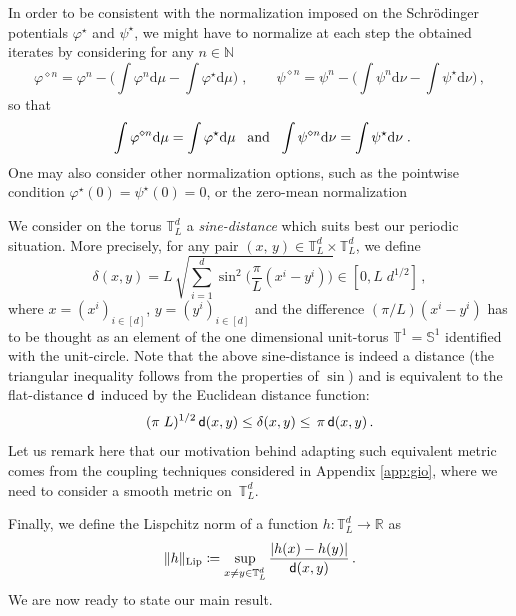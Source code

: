 \documentclass[final,12pt]{colt2023} %
\newcommand{\bes}{\begin{equation}}
\newcommand{\ees}{\end{equation}}
\newcommand{\De}{\mathrm{d}}
\newcommand{\sfd}{{\sf d}}
\def\torus{\tset}
\def\torusL{\torus_L}
\def\tset{\mathbb{T}}
\def\eqsp{\;}
\def\varphistar{\varphi^\star}
\def\psistar{\psi^{\star}}
\begin{document}
In order to be consistent with the normalization imposed on the Schr\"odinger potentials $\varphistar$ and $\psistar$, we might have to normalize at each step the obtained iterates by considering for any $n\in \mathbb{N}$ 
 \bes
 \varphi^{\diamond n}=\varphi^n-\biggl(\int\varphi^n\De\mu-\int\varphistar\De\mu\biggr)\eqsp, \qquad 
 \psi^{\diamond n}=\psi^n-\biggl(\int\psi^n\De\nu-\int\psistar\De\nu\biggr)\,,
 \ees
 so that
 \begin{equation}
   \label{eq:equality_int}
\text{   $\int\varphi^{\diamond n}\De\mu=\int\varphistar\De\mu$ \, and \,  $\int\psi^{\diamond n}\De\nu=\int\psistar\De\nu $} \eqsp.
 \end{equation}
One may also consider other normalization options, such as  the pointwise condition $\varphistar(0)=\psistar(0)=0$, or the zero-mean normalization \citep{marinogerolin2020, carlier2020differential, deligiannidis2021quantitative, Carlier22multisink}
 

We consider on the torus $\mathbb{T}_L^d$ a \emph{sine-distance} which suits best our periodic situation. More precisely, for any pair $(x,\,y)\in\mathbb{T}_L^d\times \mathbb{T}_L^d$, we define 
\begin{equation}\label{def:delta}
\delta(x,y)= L\,\sqrt{\sum_{i=1}^d \sin^2\biggl(\frac{\pi}{L}(x^i-y^i)\biggr)}\in [0,L\eqsp d^{1/2}] \, ,
\end{equation}
where $x=(x^i)_{i\in[d]}$, $y=(y^i)_{i\in[d]}$ and the difference $(\pi/L) (x^i-y^i)$ has to be thought as an element of the one dimensional unit-torus $\mathbb{T}^1=\mathbb{S}^1$ identified with the unit-circle. Note that the above sine-distance is indeed a distance (the triangular inequality follows from the properties of $\sin$) and is equivalent to the flat-distance $\sfd$ induced by the Euclidean distance function:
\[(\pi\eqsp L)^{1/2}\,\sfd(x,y)\leq \delta(x,y)\leq\,\pi\,\sfd(x,y)\,.\] Let us remark here that our motivation behind adapting such equivalent metric comes from the coupling techniques considered in Appendix \ref{app:gio}, where we need to consider a smooth metric on~$\torusL^d$.





Finally, we define the Lispchitz norm of a function $h:\mathbb{T}_L^d \to \mathbb{R}$ as
\bes
\|h\|_{\mathrm{Lip}}\coloneqq \sup_{x\neq y\in\mathbb{T}_L^d}\frac{|h(x)-h(y)|}{\sfd(x,y)} \, .
\ees
We are now ready to state our main result. 
\end{document}
